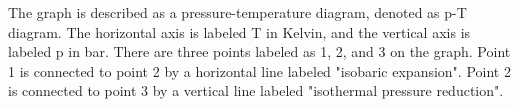 The graph is described as a pressure-temperature diagram, denoted as p-T diagram. The horizontal axis is labeled T in Kelvin, and the vertical axis is labeled p in bar. There are three points labeled as 1, 2, and 3 on the graph. Point 1 is connected to point 2 by a horizontal line labeled "isobaric expansion". Point 2 is connected to point 3 by a vertical line labeled "isothermal pressure reduction".